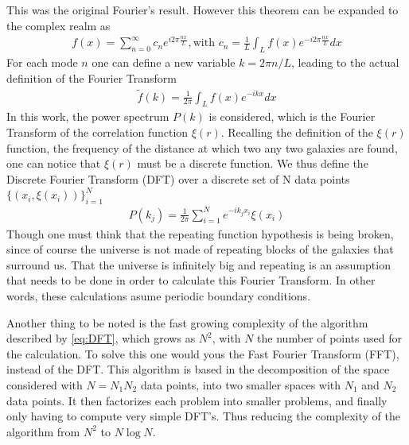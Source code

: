 This was the original Fourier's result. However this theorem can be expanded to the complex realm as 
\begin{align}
	f(x) = \sum_{n=0}^{\infty} c_n e^{i 2\pi \frac{nx}{L}}, \text{with } c_n = \frac{1}{L}\int_{L}^{} f(x) e^{-i 2\pi \frac{nx}{L}}dx 
\end{align}
For each mode $n$ one can define a new variable $k=2\pi n /L$, leading to the actual definition of the Fourier Transform 
\begin{align}
	\tilde{f}(k) = \frac{1}{2\pi}\int_{L}^{}  f(x) e^{-i k x} dx
\end{align}
In this work, the power spectrum $P(k)$ is considered, which is the Fourier Transform of the correlation function $\xi(r)$.  Recalling the definition of the $\xi(r)$ function, the frequency of the distance at which two any two galaxies are found, one can notice that  $\xi(r)$ must be a discrete function. We thus define the Discrete Fourier Transform (DFT) over a discrete set of N data points $\{\left( x_i, \xi(x_i) \right) \}_{i=1}^{N} $
\begin{align}
	P(k_j) = \frac{1}{2\pi}\sum_{i=1}^{N} e^{-i k_j x_{i}} \xi(x_i)
	\label{eq:DFT}
\end{align}
Though one must think that the repeating function hypothesis is being broken, since of course the universe is not made of repeating blocks of the galaxies that surround us. That the universe is infinitely big and repeating is an assumption that needs to be done in order to calculate this Fourier Transform. In other words, these calculations asume periodic boundary conditions.


Another thing to be noted is the fast growing complexity of the algorithm described by \eqref{eq:DFT}, which grows as $N^2$, with $N$ the number of points used for the calculation. 
To solve this one would yous the Fast Fourier Transform (FFT), instead of the DFT. This algorithm is based in the decomposition of the space considered with $N=N_1N_2$ data points, into two smaller spaces with $N_1$ and $N_2$ data points. It then factorizes each problem into smaller problems, and finally only having to compute very simple DFT's. Thus reducing the complexity of the algorithm from $N^2$ to $N\log N$. 

